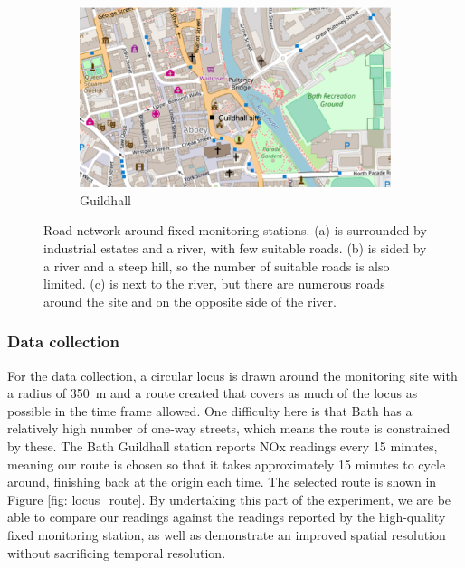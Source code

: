 \documentclass[11pt]{report}
\begin{document}
\begin{figure}[!tb]
\begin{minipage}{.9\linewidth}
\begin{subfigure}[t]{.5\linewidth}
            \includegraphics[width=\textwidth]{images/guildhall}
            \caption{Guildhall}
            \label{fig: guildhall}
        \end{subfigure}
    \end{minipage}
    \caption[Analysis of fixed monitoring station locations.]{Road network around fixed monitoring stations. (a) is surrounded by industrial estates and a river, with few suitable roads. (b) is sided by a river and a steep hill, so the number of suitable roads is also limited. (c) is next to the river, but there are numerous roads around the site and on the opposite side of the river.}
\end{figure}


\subsubsection{Data collection}

For the data collection, a circular locus is drawn around the monitoring site with a radius of 350~m and a route created that covers as much of the locus as possible in the time frame allowed. One difficulty here is that Bath has a relatively high number of one-way streets, which means the route is constrained by these. The Bath Guildhall station reports NOx readings every 15 minutes, meaning our route is chosen so that it takes approximately 15 minutes to cycle around, finishing back at the origin each time. The selected route is shown in Figure \ref{fig: locus_route}. By undertaking this part of the experiment, we are be able to compare our readings against the readings reported by the high-quality fixed monitoring station, as well as demonstrate an improved spatial resolution without sacrificing temporal resolution.
\end{document}

